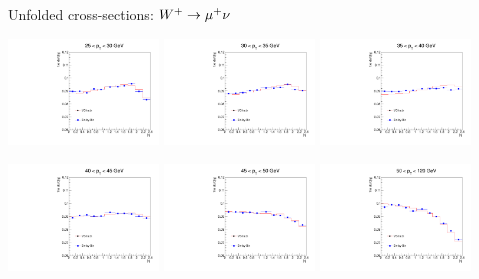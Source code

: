 \begin{frame}{Unfolded cross-sections: $W^+ \rightarrow \mu^+ \nu$}
 \begin{center}
   \includegraphics[width=0.3\textwidth]{dates/20121219/figures/xsec/POS/Wmn_Unf_2d_Slice_2.pdf}
   \includegraphics[width=0.3\textwidth]{dates/20121219/figures/xsec/POS/Wmn_Unf_2d_Slice_3.pdf}
   \includegraphics[width=0.3\textwidth]{dates/20121219/figures/xsec/POS/Wmn_Unf_2d_Slice_4.pdf}
 \end{center}
 \begin{center}
   \includegraphics[width=0.3\textwidth]{dates/20121219/figures/xsec/POS/Wmn_Unf_2d_Slice_5.pdf}
   \includegraphics[width=0.3\textwidth]{dates/20121219/figures/xsec/POS/Wmn_Unf_2d_Slice_6.pdf}
   \includegraphics[width=0.3\textwidth]{dates/20121219/figures/xsec/POS/Wmn_Unf_2d_Slice_7.pdf}
 \end{center}
\end{frame}


